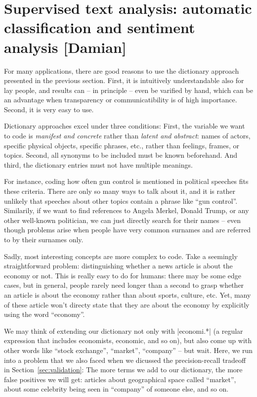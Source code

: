 \section{Supervised text analysis: automatic classification and sentiment analysis [Damian]}
\label{sec:supervised}

For many applications, there are good reasons to use the dictionary
approach presented in the previous section. First, it is intuitively
understandable also for lay people, and results can -- in principle --
even be varified by hand, which can be an advantage when transparency
or communicatibility is of high importance. Second, it is very easy to
use.

Dictionary approaches excel under three conditions: First, the
variable we want to code is \emph{manifest and concrete} rather than
\emph{latent and abstract}: names of actors, specific physical
objects, specific phrases, etc., rather than feelings, frames, or
topics. Second, all synonyms to be included must be known
beforehand. And third, the dictionary entries must not have multiple
meanings.

For instance, coding how often gun control is mentioned in political
speeches fits these criteria. There are only so many ways to talk
about it, and it is rather unlikely that speeches about other topics
contain a phrase like ``gun control''. Similarily, if we want to find
references to Angela Merkel, Donald Trump, or any other well-known
politician, we can just directly search for their names -- even though
problems arise when people have very common surnames and are referred
to by their surnames only.

Sadly, most interesting concepts are more complex to code. Take a
seemingly straightforward problem: distinguishing whether a news
article is about the economy or not. This is really easy to do for
humans: there may be some edge cases, but in general, people rarely
need longer than a second to grasp whether an article is about the
economy rather than about sports, culture, etc. Yet, many of these
article won't directy state that they are about the economy by
explicitly using the word ``economy''.

We may think of extending our dictionary not only with |economi.*| (a
regular expression that includes economists, economic, and so on), but
also come up with other words like ``stock exchange'', ``market'',
``company'' -- but wait. Here, we run into a problem that we also
faced when we dicussed the precision-recall tradeoff in
Section~\ref{sec:validation}: The more terms we add to our
dictionary, the more false positives we will get: articles about
geographical space called ``market'', about some celebrity being seen
in ``company'' of someone else, and so on.

